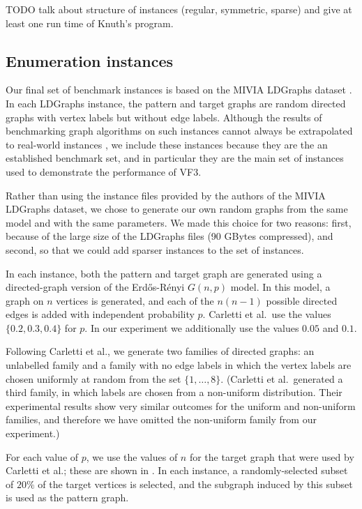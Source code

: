 TODO talk about structure of instances (regular, symmetric, sparse) and give at least one run
time of Knuth's program.

\FloatBarrier

\subsection{Enumeration instances}

Our final set of benchmark instances is based on the MIVIA LDGraphs dataset
\cite{DBLP:journals/pami/CarlettiFSV18}.  In each LDGraphs instance, the pattern and
target graphs are random directed graphs with vertex labels but without edge labels.
Although the results of benchmarking graph algorithms on such instances cannot
always be extrapolated to real-world instances \cite{DBLP:conf/cp/McCreeshPST17},
we include these instances because they are the an established benchmark set,
and in particular they are the main set of instances used to demonstrate the
performance of VF3.

Rather than using the instance files provided by the authors of the MIVIA LDGraphs
dataset, we chose to generate our own random graphs from the same model and with the
same parameters.  We made this choice for two reasons: first, because of the large size
of the LDGraphs files (90 GBytes compressed), and second, so that we could add sparser
instances to the set of instances.

In each instance, both the pattern and target graph are generated using a directed-graph
version of the Erd\H{o}s-Rényi $G(n,p)$ model.  In this model, a graph on $n$ vertices
is generated, and each of the $n(n-1)$ possible directed edges is added with independent
probability $p$.  Carletti et al.\ use the values $\{0.2, 0.3, 0.4\}$ for $p$. In our experiment
we additionally use the values $0.05$ and $0.1$.

Following Carletti et al., we generate two families of directed graphs: an unlabelled family
and a family with no edge labels in which the vertex labels are chosen uniformly at random
from the set $\{1,\dots,8\}$.  (Carletti et al.\ generated a third family, in which labels
are chosen from a non-uniform distribution.  Their experimental results show very similar
outcomes for the uniform and non-uniform families, and therefore we have omitted the non-uniform
family from our experiment.)

For each value of $p$, we use the values
of $n$ for the target graph that were used by Carletti et al.; these are shown in .
In each instance, a randomly-selected subset of $20\%$ of the target vertices is selected,
and the subgraph induced by this subset is used as the pattern graph.

